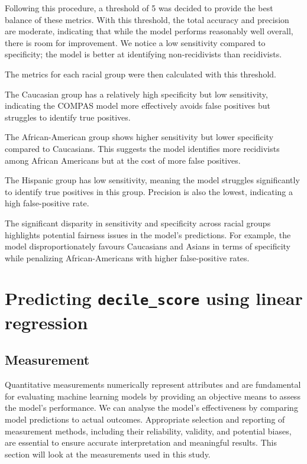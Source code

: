 \documentclass[conference]{IEEEtran}
\begin{document}
	Following this procedure, a threshold of 5 was decided to provide the best balance of these metrics. With this threshold, the total accuracy and precision are moderate, indicating that while the model performs reasonably well overall, there is room for improvement. We notice a low sensitivity compared to specificity; the model is better at identifying non-recidivists than recidivists.
	
	
	The metrics for each racial group were then calculated with this threshold.
	
	
	The Caucasian group has a relatively high specificity but low sensitivity, indicating the COMPAS model more effectively avoids false positives but struggles to identify true positives. 
	
	The African-American group shows higher sensitivity but lower specificity compared to Caucasians. This suggests the model identifies more recidivists among African Americans but at the cost of more false positives.
	
	
	The Hispanic group has low sensitivity, meaning the model struggles significantly to identify true positives in this group. Precision is also the lowest, indicating a high false-positive rate.
	
	
	The significant disparity in sensitivity and specificity across racial groups highlights potential fairness issues in the model's predictions. For example, the model disproportionately favours Caucasians and Asians in terms of specificity while penalizing African-Americans with higher false-positive rates.
	
	\section{Predicting \textbf{\texttt{decile\_score}} using linear regression}
	
	\subsection{Measurement}
	
	Quantitative measurements numerically represent attributes and are fundamental for evaluating machine learning models by providing an objective means to assess the model's performance. We can analyse the model's effectiveness by comparing model predictions to actual outcomes. Appropriate selection and reporting of measurement methods, including their reliability, validity, and potential biases, are essential to ensure accurate interpretation and meaningful results. This section will look at the measurements used in this study.
	
\end{document}
